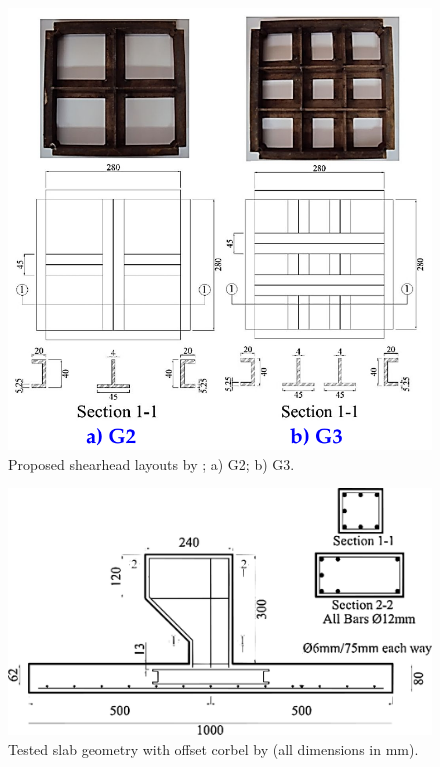 \documentclass[twocolumn]{article} %
\begin{document}
\begin{figure}\centering
\includegraphics[width=\columnwidth]{Figures/tikzout/ahf5.pdf}
\caption{Proposed shearhead layouts by \cite{Al-hamd2018}; a) G2; b) G3. }\label{ahf5}
\end{figure}
\begin{figure}\centering
\includegraphics[width=\columnwidth]{Figures/ahf4.pdf}
\caption{Tested slab geometry with offset corbel by \cite{Al-hamd2018} (all dimensions in mm).}\label{ahf4}
\end{figure}
\end{document}
